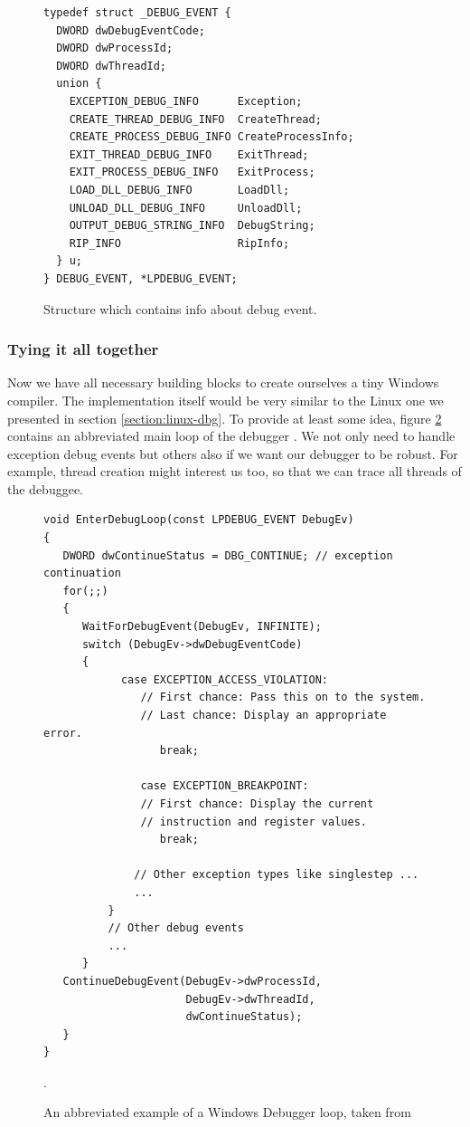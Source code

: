 \begin{figure}
\begin{verbatim}
typedef struct _DEBUG_EVENT {
  DWORD dwDebugEventCode;
  DWORD dwProcessId;
  DWORD dwThreadId;
  union {
    EXCEPTION_DEBUG_INFO      Exception;
    CREATE_THREAD_DEBUG_INFO  CreateThread;
    CREATE_PROCESS_DEBUG_INFO CreateProcessInfo;
    EXIT_THREAD_DEBUG_INFO    ExitThread;
    EXIT_PROCESS_DEBUG_INFO   ExitProcess;
    LOAD_DLL_DEBUG_INFO       LoadDll;
    UNLOAD_DLL_DEBUG_INFO     UnloadDll;
    OUTPUT_DEBUG_STRING_INFO  DebugString;
    RIP_INFO                  RipInfo;
  } u;
} DEBUG_EVENT, *LPDEBUG_EVENT;
\end{verbatim}
\caption{Structure which contains info about debug event.}
\label{fig:DebugEvent}
\end{figure}

\subsubsection*{Tying it all together}
Now we have all necessary building blocks to create ourselves a tiny Windows
compiler. The implementation itself would be very similar to the Linux one we
presented in section \ref{section:linux-dbg}. To provide at least some idea,
figure \ref{fig:windows-debugger-mainloop} contains an abbreviated main loop of
the debugger \cite{windows-msdn-dbg-main-loop}. We not only need to handle
exception debug events but others also if we want our debugger to be robust.
For example, thread creation might interest us too, so that we can trace all
threads of the debuggee.

\begin{figure}\label{fig:windows-debugger-mainloop}
    \begin{verbatim}
void EnterDebugLoop(const LPDEBUG_EVENT DebugEv)
{
   DWORD dwContinueStatus = DBG_CONTINUE; // exception continuation
   for(;;)
   {
      WaitForDebugEvent(DebugEv, INFINITE);
      switch (DebugEv->dwDebugEventCode)
      {
            case EXCEPTION_ACCESS_VIOLATION: 
               // First chance: Pass this on to the system.
               // Last chance: Display an appropriate error.
                  break;

               case EXCEPTION_BREAKPOINT:
               // First chance: Display the current
               // instruction and register values.
                  break;

              // Other exception types like singlestep ...
              ...
          }
          // Other debug events
          ...
      }
   ContinueDebugEvent(DebugEv->dwProcessId,
                      DebugEv->dwThreadId,
                      dwContinueStatus);
   }
}
    \end{verbatim}
    \caption{An abbreviated example of a Windows Debugger loop, taken from \cite{windows-msdn-dbg-main-loop}}.
\end{figure}

